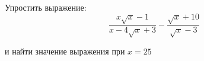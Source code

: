 \begin{ex}
	\begin{condition}
		Упростить выражение:
		\[ \dfrac{x\sqrt{x}-1}{x-4\sqrt{x}+3}-\dfrac{\sqrt{x}+10}{\sqrt{x}-3} \]
		
		 и найти значение выражения при \( x=25 \)
	\end{condition}
\end{ex}